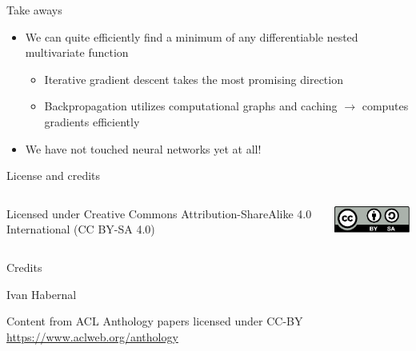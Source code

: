 \documentclass[12pt,aspectratio=169]{beamer}
\begin{document}
\begin{frame}{Take aways}
	
\begin{itemize}
	
	\item We can quite efficiently find a minimum of any differentiable nested multivariate function
	\begin{itemize}
		\item Iterative gradient descent takes the most promising direction
		\item Backpropagation utilizes computational graphs and caching $\to$ computes gradients efficiently
	\end{itemize}
	\item We have not touched neural networks yet at all!
\end{itemize}
	
\end{frame}



\begin{frame}{License and credits}

	\begin{columns}
		\begin{column}{0.7\textwidth}
			Licensed under Creative Commons Attribution-ShareAlike 4.0 International (CC BY-SA 4.0)
		\end{column}
		\begin{column}{0.2\textwidth}
			\includegraphics[width=0.9\linewidth]{img/cc-by-sa-icon.pdf}
		\end{column}
	\end{columns}
	
	\bigskip
	
	Credits
	
	\begin{scriptsize}
		
		Ivan Habernal
		
		Content from ACL Anthology papers licensed under CC-BY \url{https://www.aclweb.org/anthology}
		
	\end{scriptsize}
	
\end{frame}
\end{document}
